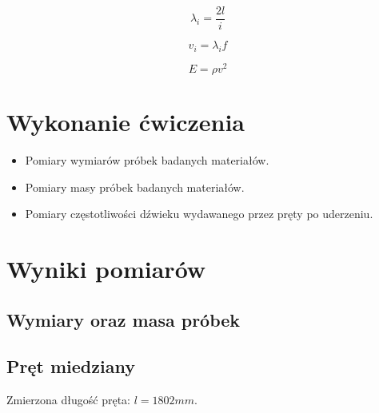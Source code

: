 \documentclass[a4paper,10pt,twoside]{article}
\begin{document}
$$ \lambda_i = \frac{2l}{i} $$

$$ v_i = \lambda_if $$

$$ E = \rho v^2 $$


\section{Wykonanie ćwiczenia}

\begin{itemize}
	\item Pomiary wymiarów próbek badanych materiałów.
	\item Pomiary masy próbek badanych materiałów.
	\item Pomiary częstotliwości dźwieku wydawanego przez pręty po uderzeniu.
\end{itemize}

\section{Wyniki pomiarów}

\subsection{Wymiary oraz masa próbek}



\subsection{Pręt miedziany}

Zmierzona długość pręta: $ l = 1802 \unit{mm} $.
\end{document}
